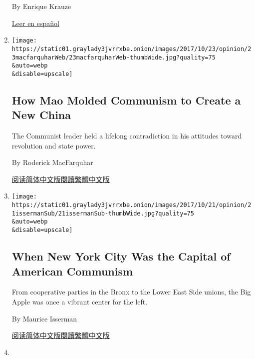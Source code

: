 \begin{enumerate}
  By Enrique Krauze

  \href{https://www.nytimes3xbfgragh.onion/es/2017/10/17/la-revolucion-domesticada}{Leer
  en español}
\item
  \href{/2017/10/23/opinion/how-mao-molded-communism-to-create-a-new-china.html}{}

  \texttt{[image: https://static01.graylady3jvrrxbe.onion/images/2017/10/23/opinion/23macfarquharWeb/23macfarquharWeb-thumbWide.jpg?quality=75\\\&auto=webp\\\&disable=upscale]}

  \hypertarget{how-mao-molded-communism-to-create-a-new-china}{%
  \subsection{How Mao Molded Communism to Create a New
  China}\label{how-mao-molded-communism-to-create-a-new-china}}

  The Communist leader held a lifelong contradiction in his attitudes
  toward revolution and state power.

  By Roderick MacFarquhar

  \href{https://cn.nytimes3xbfgragh.onion/opinion/20171024/how-mao-molded-communism-to-create-a-new-china/}{阅读简体中文版}\href{https://cn.nytimes3xbfgragh.onion/opinion/20171024/how-mao-molded-communism-to-create-a-new-china/zh-hant/}{閱讀繁體中文版}
\item
  \href{/2017/10/20/opinion/new-york-american-communism.html}{}

  \texttt{[image: https://static01.graylady3jvrrxbe.onion/images/2017/10/21/opinion/21issermanSub/21issermanSub-thumbWide.jpg?quality=75\\\&auto=webp\\\&disable=upscale]}

  \hypertarget{when-new-york-city-was-the-capital-of-american-communism}{%
  \subsection{When New York City Was the Capital of American
  Communism}\label{when-new-york-city-was-the-capital-of-american-communism}}

  From cooperative parties in the Bronx to the Lower East Side unions,
  the Big Apple was once a vibrant center for the left.

  By Maurice Isserman

  \href{http://cn.nytimes3xbfgragh.onion/opinion/20171023/new-york-american-communism/}{阅读简体中文版}\href{http://cn.nytimes3xbfgragh.onion/opinion/20171023/new-york-american-communism/zh-hant/}{閱讀繁體中文版}
\item
  \href{/2017/10/16/opinion/john-reed-russian-revolution-journalism.html}{}


\end{enumerate}
